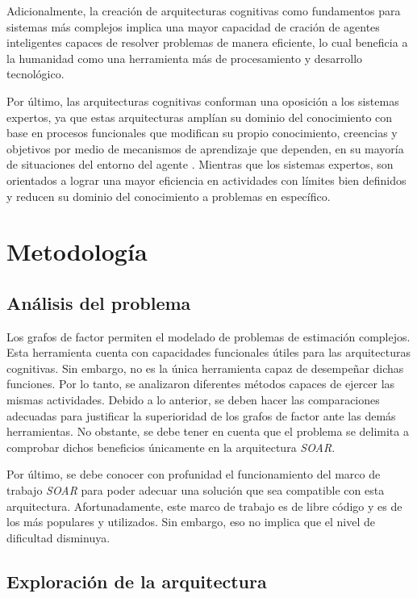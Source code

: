 Adicionalmente, la creaci\'{o}n de arquitecturas cognitivas como fundamentos para sistemas m\'{a}s complejos implica una mayor capacidad de craci\'{o}n de agentes inteligentes capaces de resolver problemas de manera eficiente, lo cual beneficia a la humanidad como una herramienta m\'{a}s de procesamiento y desarrollo tecnol\'{o}gico.
 
 Por \'{u}ltimo, las arquitecturas cognitivas conforman una oposici\'{o}n a los sistemas expertos, ya que estas arquitecturas ampl\'{i}an su dominio del conocimiento con base en procesos funcionales que modifican su propio conocimiento, creencias y objetivos por medio de mecanismos de aprendizaje que dependen, en su mayor\'{i}a de situaciones del entorno del agente \cite{langley2009cognitive}. Mientras que los sistemas expertos, son orientados a lograr una mayor eficiencia en actividades con l\'{i}mites bien definidos y reducen su dominio del conocimiento a problemas en espec\'{i}fico.
 
 \section{Metodolog\'{i}a}
 \subsection{An\'{a}lisis del problema}
 
Los grafos de factor permiten el modelado de problemas de estimaci\'{o}n complejos. Esta herramienta cuenta con capacidades funcionales \'{u}tiles para las arquitecturas cognitivas. Sin embargo, no es la \'{u}nica herramienta capaz de desempe\~nar dichas funciones. Por lo tanto, se analizaron diferentes m\'{e}todos capaces de ejercer las mismas actividades. Debido a lo anterior, se deben hacer las comparaciones adecuadas para justificar la superioridad de los grafos de factor ante las dem\'{a}s herramientas. No obstante, se debe tener en cuenta que el problema se delimita a comprobar dichos beneficios \'{u}nicamente en la arquitectura \emph{SOAR}.

Por \'{u}ltimo, se debe conocer con profunidad el funcionamiento del marco de trabajo \emph{SOAR} para poder adecuar una soluci\'{o}n que sea compatible con esta arquitectura. Afortunadamente, este marco de trabajo es de libre c\'{o}digo y es de los m\'{a}s populares y utilizados. Sin embargo, eso no implica que el nivel de dificultad disminuya.
 
 
 \subsection{Exploraci\'{o}n de la arquitectura}
 
